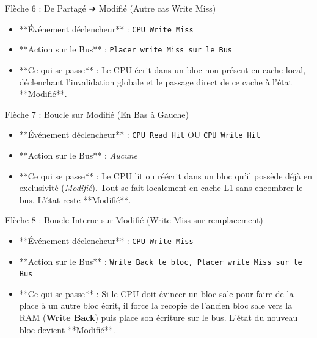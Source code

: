 \documentclass[12pt,a4paper]{article}
\begin{document}
\begin{transitionbox}{Flèche 6 : De Partagé ➔ Modifié (Autre cas Write Miss)}
\begin{itemize}
    \item **Événement déclencheur** : \texttt{CPU Write Miss}
    \item **Action sur le Bus** : \texttt{Placer write Miss sur le Bus}
    \item **Ce qui se passe** : Le CPU écrit dans un bloc non présent en cache local, déclenchant l'invalidation globale et le passage direct de ce cache à l'état **Modifié**.
\end{itemize}
\end{transitionbox}

\begin{transitionbox}{Flèche 7 : Boucle sur Modifié (En Bas à Gauche)}
\begin{itemize}
    \item **Événement déclencheur** : \texttt{CPU Read Hit} OU \texttt{CPU Write Hit}
    \item **Action sur le Bus** : \textit{Aucune}
    \item **Ce qui se passe** : Le CPU lit ou réécrit dans un bloc qu'il possède déjà en exclusivité (\textit{Modifié}). Tout se fait localement en cache L1 sans encombrer le bus. L'état reste **Modifié**.
\end{itemize}
\end{transitionbox}

\begin{transitionbox}{Flèche 8 : Boucle Interne sur Modifié (Write Miss sur remplacement)}
\begin{itemize}
    \item **Événement déclencheur** : \texttt{CPU Write Miss}
    \item **Action sur le Bus** : \texttt{Write Back le bloc, Placer write Miss sur le Bus}
    \item **Ce qui se passe** : Si le CPU doit évincer un bloc sale pour faire de la place à un autre bloc écrit, il force la recopie de l'ancien bloc sale vers la RAM (\textbf{Write Back}) puis place son écriture sur le bus. L'état du nouveau bloc devient **Modifié**.
\end{itemize}
\end{transitionbox}
\end{document}

